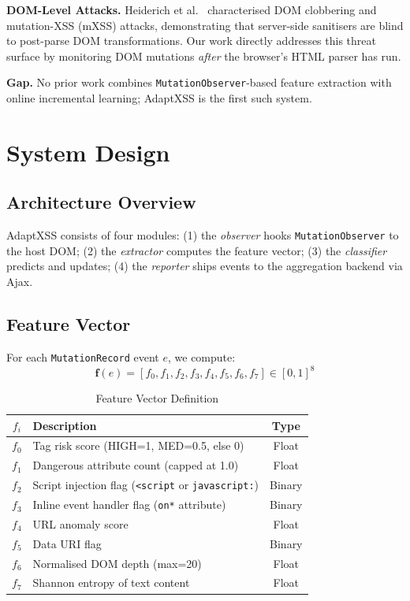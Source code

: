 \documentclass[conference]{IEEEtran}
\begin{document}
\textbf{DOM-Level Attacks.} Heiderich et al.\ \cite{heiderich2012} characterised DOM clobbering and mutation-XSS (mXSS) attacks, demonstrating that server-side sanitisers are blind to post-parse DOM transformations. Our work directly addresses this threat surface by monitoring DOM mutations \textit{after} the browser's HTML parser has run.

\textbf{Gap.} No prior work combines \texttt{MutationObserver}-based feature extraction with online incremental learning; AdaptXSS is the first such system.

\section{System Design}

\subsection{Architecture Overview}
AdaptXSS consists of four modules: (1) the \textit{observer} hooks \texttt{MutationObserver} to the host DOM; (2) the \textit{extractor} computes the feature vector; (3) the \textit{classifier} predicts and updates; (4) the \textit{reporter} ships events to the aggregation backend via Ajax.

\subsection{Feature Vector}
For each \texttt{MutationRecord} event $e$, we compute:
\begin{equation}
\mathbf{f}(e) = [f_0, f_1, f_2, f_3, f_4, f_5, f_6, f_7] \in [0,1]^8
\end{equation}

\begin{table}[h]
\caption{Feature Vector Definition}
\centering
\begin{tabular}{clc}
\toprule
$f_i$ & Description & Type \\
\midrule
$f_0$ & Tag risk score (HIGH=1, MED=0.5, else 0) & Float \\
$f_1$ & Dangerous attribute count (capped at 1.0) & Float \\
$f_2$ & Script injection flag (\texttt{<script} or \texttt{javascript:}) & Binary \\
$f_3$ & Inline event handler flag (\texttt{on*} attribute) & Binary \\
$f_4$ & URL anomaly score & Float \\
$f_5$ & Data URI flag & Binary \\
$f_6$ & Normalised DOM depth (max=20) & Float \\
$f_7$ & Shannon entropy of text content & Float \\
\bottomrule
\end{tabular}
\end{table}
\end{document}
